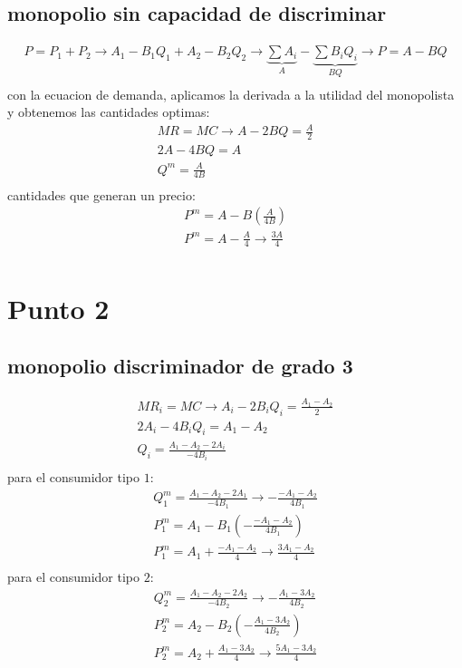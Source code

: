 \documentclass[11pt]{article}
\begin{document}
\subsection{monopolio sin capacidad de discriminar}
\begin{flushleft}
    \begin{align*}
        P=P_1+P_2 \to A_1-B_1Q_1+A_2-B_2Q_2 \to \underbrace{\sum A_i}_{A}-\underbrace{\sum B_iQ_i}_{BQ} \to P=A-BQ\\
    \end{align*}
    con la ecuacion de demanda, aplicamos la derivada a la utilidad del monopolista y obtenemos las cantidades optimas:
    \begin{align*}
        MR = MC \to A-2BQ = \frac{A}{2}\\
        2A-4BQ = A\\
        Q^m=\frac{A}{4B}\\
    \end{align*}
    cantidades que generan un precio:
    \begin{align*}
        P^m=A-B\left(\frac{A}{4B}\right)\\
        P^m=A-\frac{A}{4} \to \frac{3A}{4}\\
    \end{align*}
\end{flushleft}
\section{Punto 2}
\subsection{monopolio discriminador de grado 3}
\begin{flushleft}
    \begin{align*}
        MR_i = MC \to A_i-2B_iQ_i = \frac{A_1-A_2}{2}\\
        2A_i-4B_iQ_i = A_1-A_2\\
        Q_i=\frac{A_1-A_2-2A_i}{-4B_i}\\
    \end{align*}
    para el consumidor tipo $1$:
    \begin{align*}
        Q_1^m=\frac{A_1-A_2-2A_1}{-4B_1} \to -\frac{-A_1-A_2}{4B_1}\\
        P^m_1=A_1-B_1\left(-\frac{-A_1-A_2}{4B_1}\right)\\
        P^m_1=A_1+\frac{-A_1-A_2}{4} \to \frac{3A_1-A_2}{4}\\
    \end{align*}
    para el consumidor tipo $2$:
    \begin{align*}
        Q_2^m=\frac{A_1-A_2-2A_2}{-4B_2} \to -\frac{A_1-3A_2}{4B_2}\\
        P^m_2=A_2-B_2\left(-\frac{A_1-3A_2}{4B_2}\right)\\
        P^m_2=A_2+\frac{A_1-3A_2}{4} \to \frac{5A_1-3A_2}{4}\\
    \end{align*}
\end{flushleft}
\end{document}
